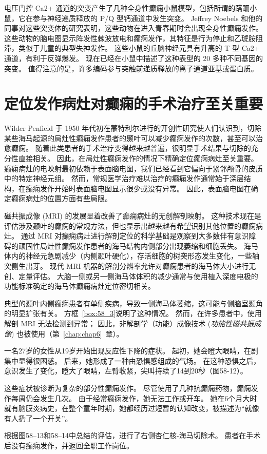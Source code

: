 电压门控 Ca2+ 通道的突变产生了几种全身性癫痫小鼠模型，包括所谓的蹒跚小鼠，它在参与神经递质释放的 P/Q 型钙通道中发生突变。
Jeffrey Noebels 和他的同事对这些突变体的研究表明，这些动物在进入青春期时会出现全身性癫痫发作。
这些动物的脑电图显示阵发性棘波放电和癫痫发作，其特征是行为停止和乙琥胺阻滞，类似于儿童的典型失神发作。
这些小鼠的丘脑神经元具有升高的 T 型 Ca2+ 通道，有利于反弹爆发。
现在已经在小鼠中描述了这种表型的 20 多种不同基因的突变。
值得注意的是，许多编码参与突触前递质释放的离子通道亚基或蛋白质。



\section{定位发作病灶对癫痫的手术治疗至关重要}

Wilder Penfield 于 1950 年代初在蒙特利尔进行的开创性研究使人们认识到，切除某些海马起源的局灶性癫痫发作患者的颞叶可以减少癫痫发作的次数，甚至可以治愈癫痫。
随着此类患者的手术治疗变得越来越普遍，很明显手术结果与切除的充分性直接相关。
因此，在局灶性癫痫发作的情况下精确定位癫痫病灶至关重要。
癫痫病灶的电映射最初依赖于表面脑电图，我们已经看到它偏向于紧邻颅骨的皮质中的特定神经元组。
然而，常规医学治疗难以治疗的癫痫发作通常始于深层结构，在癫痫发作开始时表面脑电图显示很少或没有异常。
因此，表面脑电图在确定癫痫病灶的位置方面有些局限。



磁共振成像 (MRI) 的发展显着改善了癫痫病灶的无创解剖映射。
这种技术现在是评估涉及颞叶的癫痫的常规方法，但也显示出越来越有希望识别其他位置的癫痫病灶。
通过 MRI 对癫痫病灶进行解剖定位的科学基础是观察到大多数伴有意识障碍的顽固性局灶性癫痫发作患者的海马结构内侧部分出现萎缩和细胞丢失。
海马体内的神经元急剧减少（内侧颞叶硬化），存活细胞的树突形态发生变化，一些轴突侧生出芽。
现代 MRI 机器的解剖分辨率允许对癫痫患者的海马体大小进行无创、定量评估。
大脑一侧或另一侧海马体体积的减少通常与使用植入深度电极的功能标准确定的海马体癫痫病灶定位密切相关。


典型的颞叶内侧癫痫患者有单侧疾病，导致一侧海马体萎缩，这可能与侧脑室颞角的明显扩张有关。
方框~\ref{box:58_3}说明了这种情况。
然而，在许多患者中，使用解剖 MRI 无法检测到异常；
因此，非解剖学（功能）成像技术 (\textit{功能性磁共振成像}) 也被使用（第~\ref{chap:chap6}~章）。


\begin{proposition}[神经解剖学导航术语] \label{box:58_3}
	
	\quad \quad 一名27岁的女性从19岁开始出现反应性下降的症状。
	起初，她会瞪大眼睛，在剧集中显得很困惑。
	后来，她形成了一种由恐惧感组成的气场。
	在这种恐惧之后，意识发生了变化，瞪大了眼睛，左臂收紧，尖叫持续了14到20秒（图58-12）。
	
	\quad \quad 这些症状被诊断为复杂的部分性癫痫发作。
	尽管使用了几种抗癫痫药物，癫痫发作每周仍会发生几次。
	由于经常癫痫发作，她无法工作或开车。
	她在6个月大时就有脑膜炎病史，在整个童年时期，她都经历过短暂的认知改变，被描述为“就像有人扔了一个开关”。
	
	\quad \quad 根据图58–13和58–14中总结的评估，进行了右侧杏仁核-海马切除术。
	患者在手术后没有癫痫发作，并返回全职工作岗位。
	
\end{proposition}


